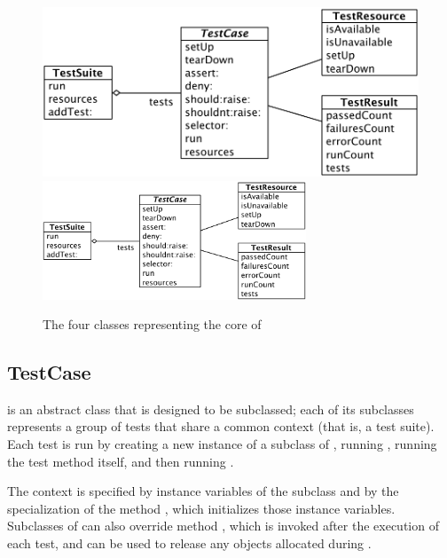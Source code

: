 \documentclass[a4paper,10pt,twoside]{book}
\begin{document}
\begin{figure}[htb]
  \begin{center}
  	\ifluluelse
		{\includegraphics[width=\textwidth]{sunit-classes}}
		{\includegraphics[width=0.7\textwidth]{sunit-classes}}
	\caption{The four classes representing the core of \SUnit}
	\label{fig:sunit-classes}
  \end{center}
\end{figure}


\subsection{TestCase}

 is an abstract class that is designed to be subclassed; each of its subclasses represents a group of tests that share a common context (that is, a test suite).
Each test is run by creating a new instance of a subclass of ,
running , running the test method itself, and then running .

The context is specified
by instance variables of the subclass
and by the specialization of the method
, which initializes those instance variables.
Subclasses of  can also override method
, which is invoked after the execution of each test,
and can be used to release any objects
allocated during .
\end{document}
